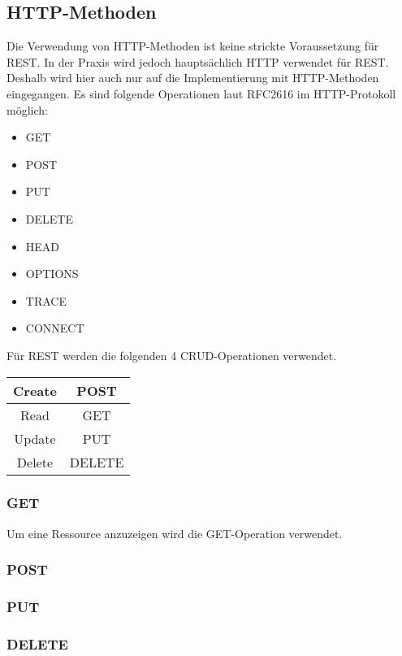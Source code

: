 \documentclass[listof=totoc]{article}
\begin{document}
	\subsection{\ac{HTTP}-Methoden}
	Die Verwendung von \ac{HTTP}-Methoden ist keine strickte Voraussetzung für REST.
	In der Praxis wird jedoch hauptsächlich \ac{HTTP} verwendet für REST. Deshalb wird hier auch nur auf die Implementierung mit \ac{HTTP}-Methoden eingegangen.
	\newline \newline
	Es sind folgende Operationen laut RFC2616\cite{RFC2616} im \ac{HTTP}-Protokoll möglich:
	\begin{itemize} 
		\setlength{\itemsep}{0pt} 
		\item GET
		\item POST
		\item PUT
		\item DELETE
		\item HEAD
		\item OPTIONS
		\item TRACE
		\item CONNECT
	\end{itemize}
	\begin{center}
	Für \ac{REST} werden die folgenden 4 \ac{CRUD}-Operationen verwendet. 
	\newline \newline
	\begin{tabular}{|c|c|}
		\hline 
		Create & POST \\ 
		\hline 
		Read & GET \\ 
		\hline 
		Update & PUT \\ 
		\hline 
		Delete & DELETE \\ 
		\hline 
	\end{tabular} 
	\end{center}
	\newpage
	\subsubsection{GET}
	Um eine Ressource anzuzeigen wird die GET-Operation verwendet. 
	\subsubsection{POST}
	\subsubsection{PUT}
	\subsubsection{DELETE}
\end{document}
